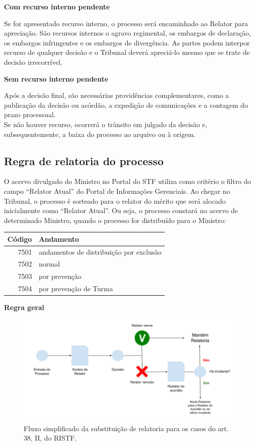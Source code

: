 \documentclass[
]{book}
\begin{document}
\textbf{Com recurso interno pendente}

Se for apresentado recurso interno, o processo será encaminhado ao Relator para apreciação.
São recursos internos o agravo regimental, os embargos de declaração, os embargos infringentes e os embargos de divergência.
As partes podem interpor recurso de qualquer decisão e o Tribunal deverá apreciá-lo mesmo que se trate de decisão irrecorrível.

\textbf{Sem recurso interno pendente}

Após a decisão final, são necessárias providências complementares, como a publicação da decisão ou acórdão, a expedição de comunicações e a contagem do prazo processual.\\
Se não houver recurso, ocorrerá o trânsito em julgado da decisão e, subsequentemente, a baixa do processo ao arquivo ou à origem.

\hypertarget{regra-relatoria}{%
\subsection{Regra de relatoria do processo}\label{regra-relatoria}}

O acervo divulgado do Ministro no Portal do STF utiliza como critério o filtro do campo ``Relator Atual'' do Portal de Informações Gerenciais. Ao chegar no Tribunal, o processo é sorteado para o relator do mérito que será alocado inicialmente como ``Relator Atual''.
Ou seja, o processo constará no acervo de determinado Ministro, quando o processo for distribuído para o Ministro:

\begin{tabular}{r|l}
\hline
Código & Andamento\\
\hline
7501 & andamentos de distribuição por exclusão\\
\hline
7502 & normal\\
\hline
7503 & por prevenção\\
\hline
7504 & por prevenção de Turma\\
\hline
\end{tabular}

\textbf{Regra geral}

\begin{figure}
\includegraphics[width=1\linewidth]{imagens/fig-cap4-3} \caption{Fluxo simplificado da substituição de relatoria para os casos do  art. 38, II, do RISTF.}\label{fig:unnamed-chunk-17}
\end{figure}
\end{document}

